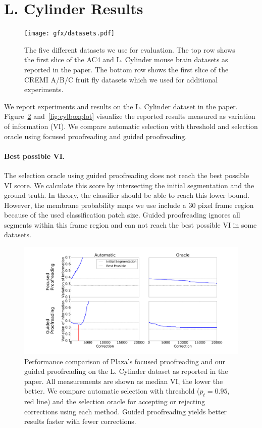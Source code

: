 \section{L. Cylinder Results}

\begin{figure}[t]
\centering
\texttt{[image: gfx/datasets.pdf]}
\caption{The five different datasets we use for evaluation. The top row shows the first slice of the AC4 and L. Cylinder mouse brain datasets as reported in the paper. The bottom row shows the first slice of the CREMI A/B/C fruit fly datasets which we used for additional experiments.}
\label{fig:datasets}
\end{figure}

We report experiments and results on the L. Cylinder dataset in the paper. Figure~\ref{fig:cyltrails} and~\ref{fig:cylboxplot} visualize the reported results measured as variation of information (VI). We compare automatic selection with threshold and selection oracle using focused proofreading and guided proofreading.

\paragraph{Best possible VI.} The selection oracle using guided proofreading does not reach the best possible VI score. We calculate this score by intersecting the initial segmentation and the ground truth. In theory, the classifier should be able to reach this lower bound. However, the membrane probability maps we use include a 30 pixel frame region because of the used classification patch size. Guided proofreading ignores all segments within this frame region and can not reach the best possible VI in some datasets.

\begin{figure}[t]
\centering
\includegraphics[width=\linewidth]{gfx/cyltrails.pdf}
\caption{Performance comparison of Plaza's focused proofreading and our guided proofreading on the L. Cylinder dataset as reported in the paper. All measurements are shown as median VI, the lower the better. We compare automatic selection with threshold ($p_t=0.95$, red line) and the selection oracle for accepting or rejecting corrections using each method. Guided proofreading yields better results faster with fewer corrections.}
\label{fig:cyltrails}
\end{figure}

